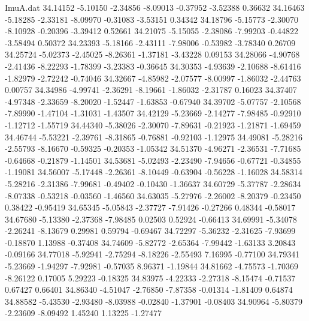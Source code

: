 \begin{filecontents}{ImuA.dat}
  34.14152   -5.10150   -2.34856   -8.09013   -0.37952   -3.52388    0.36632
  34.16463   -5.18285   -2.33181   -8.09970   -0.31083   -3.53151    0.34342
  34.18796   -5.15773   -2.30070   -8.10928   -0.20396   -3.39412    0.52661
  34.21075   -5.15055   -2.38086   -7.99203   -0.44822   -3.58494    0.50372
  34.23393   -5.18166   -2.43111   -7.98006   -0.53982   -3.78340    0.26709
  34.25724   -5.02373   -2.45025   -8.26361   -1.37181   -3.43228    0.09153
  34.28066   -4.90768   -2.41436   -8.22293   -1.78399   -3.23383   -0.36645
  34.30353   -4.93639   -2.10688   -8.61416   -1.82979   -2.72242   -0.74046
  34.32667   -4.85982   -2.07577   -8.00997   -1.86032   -2.44763    0.00757
  34.34986   -4.99741   -2.36291   -8.19661   -1.86032   -2.31787    0.16023
  34.37407   -4.97348   -2.33659   -8.20020   -1.52447   -1.63853   -0.67940
  34.39702   -5.07757   -2.10568   -7.89990   -1.47104   -1.31031   -1.43507
  34.42129   -5.23669   -2.14277   -7.98485   -0.92910   -1.12712   -1.55719
  34.44340   -5.38026   -2.30070   -7.89631   -0.21923   -1.21871   -1.69459
  34.46744   -5.53221   -2.39761   -8.31865   -0.76881   -0.92103   -1.12975
  34.49081   -5.28216   -2.55793   -8.16670   -0.59325   -0.20353   -1.05342
  34.51370   -4.96271   -2.36531   -7.71685   -0.64668   -0.21879   -1.14501
  34.53681   -5.02493   -2.23490   -7.94656   -0.67721   -0.34855   -1.19081
  34.56007   -5.17448   -2.26361   -8.10449   -0.63904   -0.56228   -1.16028
  34.58314   -5.28216   -2.31386   -7.99681   -0.49402   -0.10430   -1.36637
  34.60729   -5.37787   -2.28634   -8.07338   -0.53218   -0.03560   -1.46560
  34.63035   -5.27976   -2.26002   -8.20379   -0.23450    0.38422   -0.95419
  34.65345   -5.05843   -2.37727   -7.91426   -0.27266    0.48344   -0.58017
  34.67680   -5.13380   -2.37368   -7.98485    0.02503    0.52924   -0.66413
  34.69991   -5.34078   -2.26241   -8.13679    0.29981    0.59794   -0.69467
  34.72297   -5.36232   -2.31625   -7.93699   -0.18870    1.13988   -0.37408
  34.74609   -5.82772   -2.65364   -7.99442   -1.63133    3.20843   -0.09166
  34.77018   -5.92941   -2.75294   -8.18226   -2.55493    7.16995   -0.77100
  34.79341   -5.23669   -1.94297   -7.92981   -0.57035    8.96371   -1.19844
  34.81662   -4.75573   -1.70369   -8.26122    0.17005    5.29223   -0.18325
  34.83975   -4.22333   -2.27318   -8.15474   -0.71537    0.67427    0.66401
  34.86340   -4.51047   -2.76850   -7.87358   -0.01314   -1.81409    0.64874
  34.88582   -5.43530   -2.93480   -8.03988   -0.02840   -1.37901   -0.08403
  34.90964   -5.80379   -2.23609   -8.09492    1.45240    1.13225   -1.27477

\end{filecontents}
